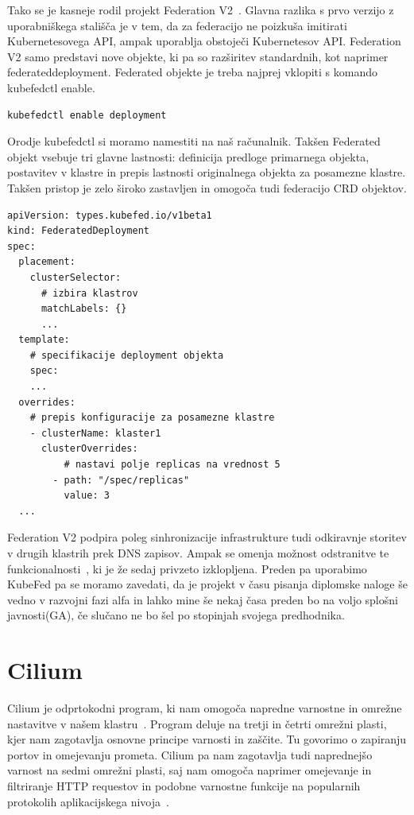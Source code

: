\documentclass[a4paper, 12pt]{book}
\begin{document}
Tako se je kasneje rodil projekt Federation V2~\cite{kubernetes-federation-evolution}.
Glavna razlika s prvo verzijo z uporabniškega stališča je v tem, da za federacijo ne poizkuša imitirati Kubernetesovega API, ampak uporablja obstoječi Kubernetesov API. 
Federation V2 samo predstavi nove objekte, ki pa so razširitev standardnih, kot naprimer federateddeployment.
Federated objekte je treba najprej vklopiti s komando kubefedctl enable.
\begin{verbatim}
kubefedctl enable deployment
\end{verbatim}
Orodje kubefedctl si moramo namestiti na naš računalnik.
Takšen Federated objekt vsebuje tri glavne lastnosti: definicija predloge primarnega objekta, postavitev v klastre in prepis lastnosti originalnega objekta za posamezne klastre.
  Takšen pristop je zelo široko zastavljen in omogoča tudi federacijo CRD objektov.
\begin{verbatim}
apiVersion: types.kubefed.io/v1beta1
kind: FederatedDeployment
spec:
  placement:
    clusterSelector:
      # izbira klastrov
      matchLabels: {}
      ... 
  template:
    # specifikacije deployment objekta
    spec:
    ... 
  overrides:
    # prepis konfiguracije za posamezne klastre
    - clusterName: klaster1
      clusterOverrides:
          # nastavi polje replicas na vrednost 5
        - path: "/spec/replicas"
          value: 3
  ... 
\end{verbatim}
  Federation V2 podpira poleg sinhronizacije infrastrukture tudi odkiravnje storitev v drugih klastrih prek DNS zapisov.
Ampak se omenja možnost odstranitve te funkcionalnosti~\cite{remove-service-discovery}, ki je že sedaj privzeto izklopljena.
  Preden pa uporabimo KubeFed pa se moramo zavedati, da je projekt v času pisanja diplomske naloge še vedno v razvojni fazi alfa in lahko mine še nekaj časa preden bo na voljo splošni javnosti(GA), če slučano ne bo šel po stopinjah svojega predhodnika.
\section{Cilium}
Cilium je odprtokodni program, ki nam omogoča napredne varnostne in omrežne nastavitve v našem klastru~\cite{cilium-intro}.
Program deluje na tretji in četrti omrežni plasti, kjer nam zagotavlja osnovne principe varnosti in zaščite.
Tu govorimo o zapiranju portov in omejevanju prometa.
Cilium pa nam zagotavlja tudi naprednejšo varnost na sedmi omrežni plasti, saj nam omogoča naprimer omejevanje in filtriranje HTTP requestov in podobne varnostne funkcije na popularnih protokolih aplikacijskega nivoja~\cite{cilium-intro}.
\end{document}
